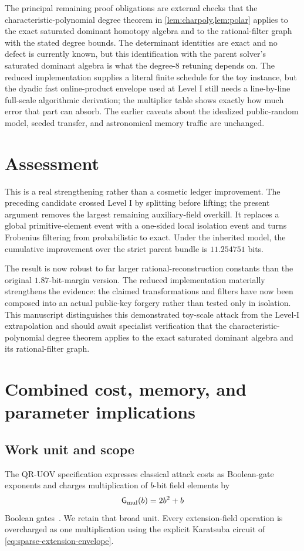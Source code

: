 \documentclass[11pt,a4paper]{article}
\theoremstyle{definition}
\theoremstyle{remark}
\newcommand{\Gmul}{\mathsf G_{\rm mul}}
\begin{document}
The principal remaining proof obligations are external checks that the characteristic-polynomial degree theorem in \cref{lem:charpoly,lem:polar} applies to the exact saturated dominant homotopy algebra and to the rational-filter graph with the stated degree bounds.  The determinant identities are exact and no defect is currently known, but this identification with the parent solver's saturated dominant algebra is what the degree-$8$ retuning depends on.  The reduced implementation supplies a literal finite schedule for the toy instance, but the dyadic fast online-product envelope used at Level I still needs a line-by-line full-scale algorithmic derivation; the multiplier table shows exactly how much error that part can absorb.  The earlier caveats about the idealized public-random model, seeded transfer, and astronomical memory traffic are unchanged.

\section{Assessment}

This is a real strengthening rather than a cosmetic ledger improvement.  The preceding candidate crossed Level I by splitting before lifting; the present argument removes the largest remaining auxiliary-field overkill.  It replaces a global primitive-element event with a one-sided local isolation event and turns Frobenius filtering from probabilistic to exact.  Under the inherited model, the cumulative improvement over the strict parent bundle is $11.254751$ bits.

The result is now robust to far larger rational-reconstruction constants than the original $1.87$-bit-margin version.  The reduced implementation materially strengthens the evidence: the claimed transformations and filters have now been composed into an actual public-key forgery rather than tested only in isolation.  This manuscript distinguishes this demonstrated toy-scale attack from the Level-I extrapolation and should await specialist verification that the characteristic-polynomial degree theorem applies to the exact saturated dominant algebra and its rational-filter graph.



\section{Combined cost, memory, and parameter implications}\label{sec:security}

\subsection{Work unit and scope}
The QR-UOV specification expresses classical attack costs as Boolean-gate
exponents and charges multiplication of $b$-bit field elements by
\begin{equation}\label{eq:spec-gmul-new}
 \Gmul(b)=2b^2+b
\end{equation}
Boolean gates~\cite{QRUOVSpec}.  We retain that broad unit.  Every
extension-field operation is overcharged as one multiplication using the
explicit Karatsuba circuit of \eqref{eq:sparse-extension-envelope}.
\end{document}
